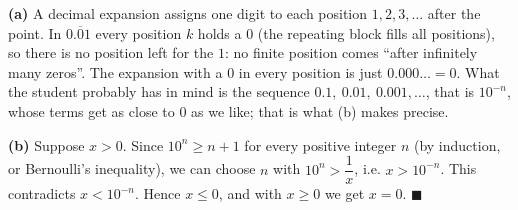 \textbf{(a)} A decimal expansion assigns one digit to each position $1,2,3,\dots$ after the point. In $0.\overline{0}1$ every position $k$ holds a $0$ (the repeating block fills all positions), so there is no position left for the $1$: no finite position comes ``after infinitely many zeros''. The expansion with a $0$ in every position is just $0.000\ldots=0$. What the student probably has in mind is the sequence $0.1,\ 0.01,\ 0.001,\dots$, that is $10^{-n}$, whose terms get as close to $0$ as we like; that is what (b) makes precise.

\textbf{(b)} Suppose $x>0$. Since $10^n\ge n+1$ for every positive integer $n$ (by induction, or Bernoulli's inequality), we can choose $n$ with $10^n>\dfrac1x$, i.e. $x>10^{-n}$. This contradicts $x<10^{-n}$. Hence $x\le0$, and with $x\ge0$ we get $\boxed{x=0}$. $\blacksquare$

